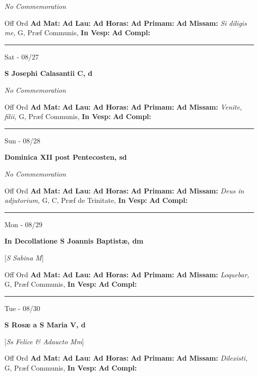 \documentclass[letterpaper, 10pt]{article}
\begin{document}
\textit{No Commemoration}\begin{justify}
Off Ord
\textbf{Ad Mat: }
\textbf{Ad Lau: }
\textbf{Ad Horas: }
\textbf{Ad Primam: }
\textbf{Ad Missam:} \textit{Si diligis me, } G, Præf Communis, 
\textbf{In Vesp: }
\textbf{Ad Compl: }\end{justify}



\hrule
\begin{center}
Sat - 08/27
\end{center}\textbf{ \large S Josephi Calasantii C, \textnormal{\normalsize d}}

\textit{No Commemoration}\begin{justify}
Off Ord
\textbf{Ad Mat: }
\textbf{Ad Lau: }
\textbf{Ad Horas: }
\textbf{Ad Primam: }
\textbf{Ad Missam:} \textit{Venite, filii, } G, Præf Communis, 
\textbf{In Vesp: }
\textbf{Ad Compl: }\end{justify}



\hrule
\begin{center}
Sun - 08/28
\end{center}\textbf{ \large Dominica XII post Pentecosten, \textnormal{\normalsize sd}}

\textit{No Commemoration}\begin{justify}
Off Ord
\textbf{Ad Mat: }
\textbf{Ad Lau: }
\textbf{Ad Horas: }
\textbf{Ad Primam: }
\textbf{Ad Missam:} \textit{Deus in adjutorium, } G, C, Præf de Trinitate, 
\textbf{In Vesp: }
\textbf{Ad Compl: }\end{justify}



\hrule
\begin{center}
Mon - 08/29
\end{center}\textbf{ \large In Decollatione S Joannis Baptistæ, \textnormal{\normalsize dm}}

[\textit{S Sabina M}]
\begin{justify}
Off Ord
\textbf{Ad Mat: }
\textbf{Ad Lau: }
\textbf{Ad Horas: }
\textbf{Ad Primam: }
\textbf{Ad Missam:} \textit{Loquebar, } G, Præf Communis, 
\textbf{In Vesp: }
\textbf{Ad Compl: }\end{justify}



\hrule
\begin{center}
Tue - 08/30
\end{center}\textbf{ \large S Rosæ a S Maria V, \textnormal{\normalsize d}}

[\textit{Ss Felice \& Adaucto Mm}]
\begin{justify}
Off Ord
\textbf{Ad Mat: }
\textbf{Ad Lau: }
\textbf{Ad Horas: }
\textbf{Ad Primam: }
\textbf{Ad Missam:} \textit{Dilexisti, } G, Præf Communis, 
\textbf{In Vesp: }
\textbf{Ad Compl: }\end{justify}
\end{document}
